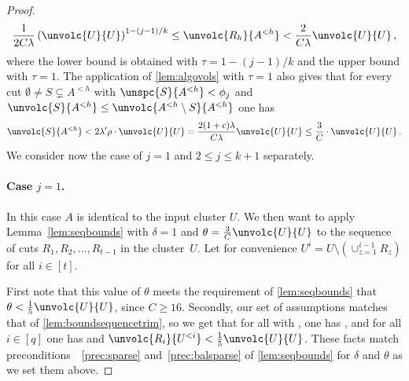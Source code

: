 \begin{proof}
	\begin{equation}
		\label{sandwich:actual}
	\frac{1}{2C\lambda}\left(\unvolc{U}{U}\right)^{1-(j-1)/k} \le \unvolc{R_h}{A^{<h}} <\frac{2}{C\lambda}\unvolc{U}{U} \, ,
	\end{equation}
	where the lower bound is obtained with $\tau=1-(j-1)/k$ and the upper bound with $\tau=1$. The application of \cref{lem:algovols} with $\tau=1$ also gives that for every cut $\emptyset \neq  S \subsetneq A^{<h}$ with $\unspc{S}{A^{<h}} < \phi_j$ and $ \unvolc{S}{A^{<h}} \le \unvolc{A^{<h}\setminus S}{A^{<h}}$ one has
	\begin{equation}
		\label{eq:absolbal}
		\unvolc{S}{A^{<h}} < 2\lambda' \rho \cdot \unvolc{U}{U} = \frac{2(1+c)\lambda}{C\lambda}  \unvolc{U}{U} \le \frac{3}{C} \cdot \unvolc{U}{U} \, .
	\end{equation}
	We consider now the case of $j=1$ and $2 \le j \le k+1$ separately.
	
	\paragraph{Case $j=1$.} In this case $A$ is identical to the input cluster $U$.	We then want to apply Lemma~\ref{lem:seqbounds} with $\delta=1$ and $\theta = \frac{3}{C}\unvolc{U}{U}$ to the sequence of cuts $R_1,R_2, \dots, R_{t-1}$ in the cluster~$U$. Let for convenience $U^i = U \setminus (\cup_{z =1}^{i-1} R_z)$ for all $i \in [t]$.
	
	First note that this value of $\theta$ meets the requirement of \cref{lem:seqbounds} that $\theta< \frac{1}{5}\unvolc{U}{U}$, since $C \ge 16$. Secondly, our set of assumptions matches that of \cref{lem:boundsequencetrim}, so we get that for all  with , one has , and for all $i \in [q]$ one has  and $ \unvolc{R_i}{U^{<i}} < \frac{1}{5}\unvolc{U}{U}$. These facts match preconditions~~\eqref{prec:sparse} and~\eqref{prec:balsparse} of \cref{lem:seqbounds} for $\delta$ and $\theta$ as we set them above.
	

\end{proof}
